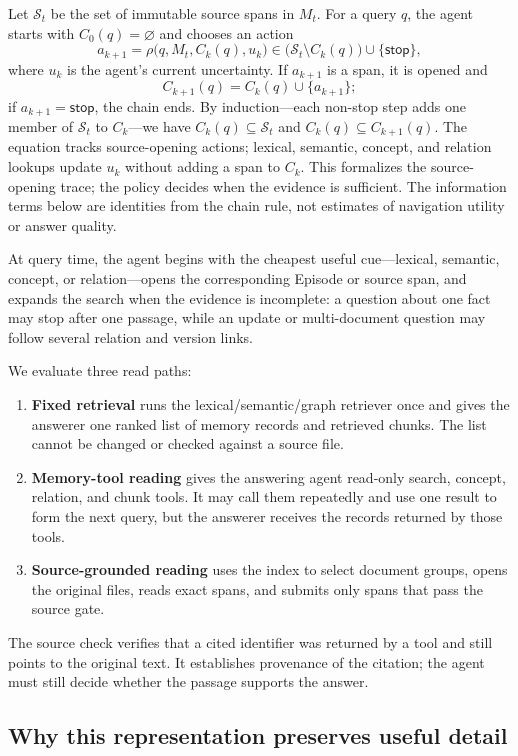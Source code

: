 Let $\mathcal S_t$ be the set of immutable source spans in $M_t$. For a query $q$, the agent starts with $C_0(q)=\varnothing$ and chooses an action
\[
a_{k+1}=\rho\bigl(q,M_t,C_k(q),u_k\bigr)
\in\bigl(\mathcal S_t\setminus C_k(q)\bigr)\cup\{\mathsf{stop}\},
\]
where $u_k$ is the agent's current uncertainty. If $a_{k+1}$ is a span, it is opened and
\[
C_{k+1}(q)=C_k(q)\cup\{a_{k+1}\};
\]
if $a_{k+1}=\mathsf{stop}$, the chain ends. By induction---each non-stop step adds one member of $\mathcal S_t$ to $C_k$---we have $C_k(q)\subseteq\mathcal S_t$ and $C_k(q)\subseteq C_{k+1}(q)$. The equation tracks source-opening actions; lexical, semantic, concept, and relation lookups update $u_k$ without adding a span to $C_k$. This formalizes the source-opening trace; the policy decides when the evidence is sufficient. The information terms below are identities from the chain rule, not estimates of navigation utility or answer quality.

At query time, the agent begins with the cheapest useful cue---lexical, semantic, concept, or relation---opens the corresponding Episode or source span, and expands the search when the evidence is incomplete: a question about one fact may stop after one passage, while an update or multi-document question may follow several relation and version links.

We evaluate three read paths:
\begin{enumerate}
    \item \textbf{Fixed retrieval} runs the lexical/semantic/graph retriever once and gives the answerer one ranked list of memory records and retrieved chunks. The list cannot be changed or checked against a source file.
    \item \textbf{Memory-tool reading} gives the answering agent read-only search, concept, relation, and chunk tools. It may call them repeatedly and use one result to form the next query, but the answerer receives the records returned by those tools.
    \item \textbf{Source-grounded reading} uses the index to select document groups, opens the original files, reads exact spans, and submits only spans that pass the source gate.
\end{enumerate}

The source check verifies that a cited identifier was returned by a tool and still points to the original text. It establishes provenance of the citation; the agent must still decide whether the passage supports the answer.

\subsection{Why this representation preserves useful detail}
\label{sec:information-view}

